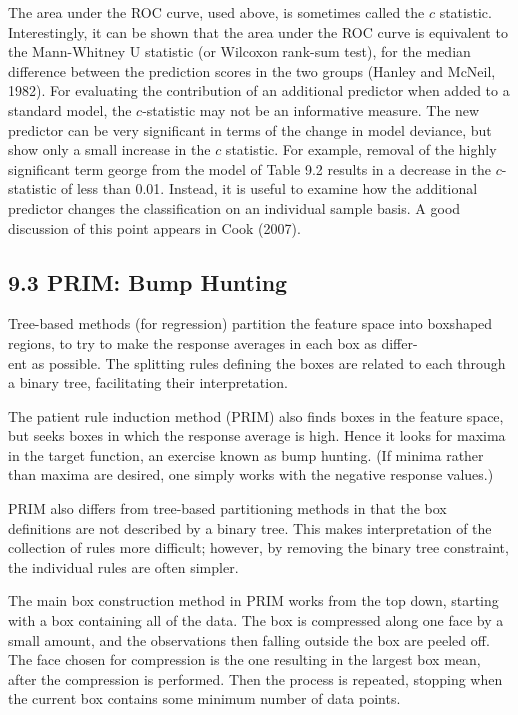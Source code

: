 \documentclass[10pt]{article}
\begin{document}
The area under the ROC curve, used above, is sometimes called the $c$ statistic. Interestingly, it can be shown that the area under the ROC curve is equivalent to the Mann-Whitney U statistic (or Wilcoxon rank-sum test), for the median difference between the prediction scores in the two groups (Hanley and McNeil, 1982). For evaluating the contribution of an additional predictor when added to a standard model, the $c$-statistic may not be an informative measure. The new predictor can be very significant in terms of the change in model deviance, but show only a small increase in the $c$ statistic. For example, removal of the highly significant term george from the model of Table 9.2 results in a decrease in the $c$-statistic of less than 0.01. Instead, it is useful to examine how the additional predictor changes the classification on an individual sample basis. A good discussion of this point appears in Cook (2007).

\subsection*{9.3 PRIM: Bump Hunting}
Tree-based methods (for regression) partition the feature space into boxshaped regions, to try to make the response averages in each box as differ-\\
ent as possible. The splitting rules defining the boxes are related to each through a binary tree, facilitating their interpretation.

The patient rule induction method (PRIM) also finds boxes in the feature space, but seeks boxes in which the response average is high. Hence it looks for maxima in the target function, an exercise known as bump hunting. (If minima rather than maxima are desired, one simply works with the negative response values.)

PRIM also differs from tree-based partitioning methods in that the box definitions are not described by a binary tree. This makes interpretation of the collection of rules more difficult; however, by removing the binary tree constraint, the individual rules are often simpler.

The main box construction method in PRIM works from the top down, starting with a box containing all of the data. The box is compressed along one face by a small amount, and the observations then falling outside the box are peeled off. The face chosen for compression is the one resulting in the largest box mean, after the compression is performed. Then the process is repeated, stopping when the current box contains some minimum number of data points.
\end{document}
